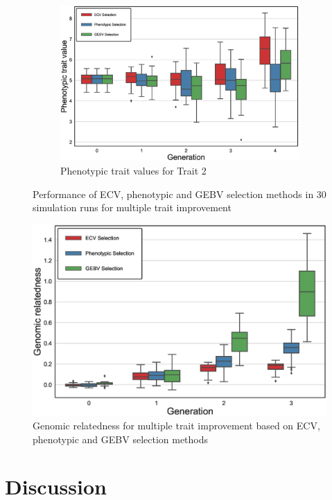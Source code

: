 \documentclass[12pt, a4paper, bibliography=totoc]{scrartcl}
\begin{document}
\begin{figure}[htb!]
\begin{subfigure}[h!t]{0.4\textwidth}
    \includegraphics[scale=0.25]{Figures/MO_pheno_values_trait2.eps}
    \caption{Phenotypic trait values for Trait 2}\label{fig.3f}
    \end{subfigure}
    \caption{Performance of ECV, phenotypic and GEBV selection methods in $30$ simulation runs for multiple trait improvement}
    \label{fig:MO_results}
\end{figure}

\begin{figure}[ht!]
    \centering
    \includegraphics[scale=0.4]{Figures/MO_inbreeding.eps}
    \caption{Genomic relatedness for multiple trait improvement based on ECV, phenotypic and GEBV selection methods}
    \label{fig:MO_inbreeding}
\end{figure}

\section*{Discussion}\label{sec:discussion} %
\end{document}
